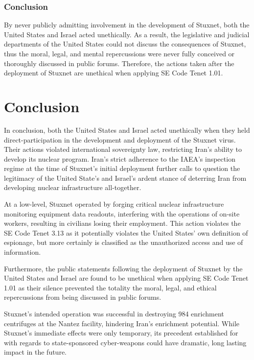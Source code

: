 \documentclass[12pt]{article}
\begin{document}
\begin{multicols}{2}
\subsubsection{Conclusion}

By never publicly admitting involvement in the development of Stuxnet, both the United States and Israel acted unethically. As a result, the legislative and judicial departments of the United States could not discuss the consequences of Stuxnet, thus the moral, legal, and mental repercussions were never fully conceived or thoroughly discussed in public forums. Therefore, the actions taken after the deployment of Stuxnet are unethical when applying SE Code Tenet 1.01.


\section{Conclusion}

In conclusion, both the United States and Israel acted unethically when they held direct-participation in the development and deployment of the Stuxnet virus. Their actions violated international sovereignty law, restricting Iran's ability to develop its nuclear program. Iran's strict adherence to the IAEA's inspection regime at the time of Stuxnet's initial deployment further calls to question the legitimacy of the United State's and Israel's ardent stance of deterring Iran from developing nuclear infrastructure all-together.

At a low-level, Stuxnet operated by forging critical nuclear infrastructure monitoring equipment data readouts, interfering with the operations of on-site workers, resulting in civilians losing their employment. This action violates the SE Code Tenet 3.13 as it potentially violates the United States' own definition of espionage, but more certainly is classified as the unauthorized access and use of information.

Furthermore, the public statements following the deployment of Stuxnet by the United States and Israel are found to be unethical when applying SE Code Tenet 1.01 as their silence prevented the totality the moral, legal, and ethical repercussions from being discussed in public forums.

Stuxnet's intended operation was successful in destroying 984 enrichment centrifuges at the Nantez facility, hindering Iran's enrichment potential. While Stuxnet's immediate effects were only temporary,  its precedent established for with regards to state-sponsored cyber-weapons could have dramatic, long lasting impact in the future.


\end{multicols}




\newpage

\end{document}
